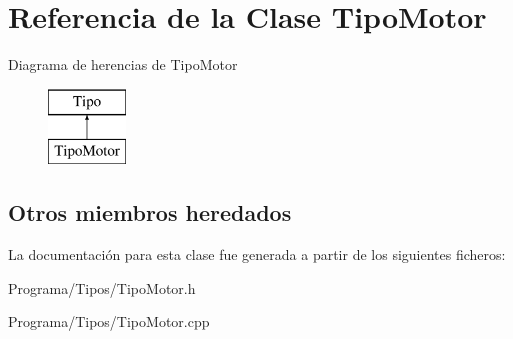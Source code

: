 \hypertarget{class_tipo_motor}{\section{Referencia de la Clase Tipo\-Motor}
\label{class_tipo_motor}
}
Diagrama de herencias de Tipo\-Motor\begin{figure}[H]
\begin{center}
\leavevmode
\includegraphics[height=2.000000cm]{class_tipo_motor}
\end{center}
\end{figure}
\subsection*{Otros miembros heredados}


La documentación para esta clase fue generada a partir de los siguientes ficheros\-:\begin{DoxyCompactItemize}
\item 
Programa/\-Tipos/Tipo\-Motor.\-h\item 
Programa/\-Tipos/Tipo\-Motor.\-cpp\end{DoxyCompactItemize}

